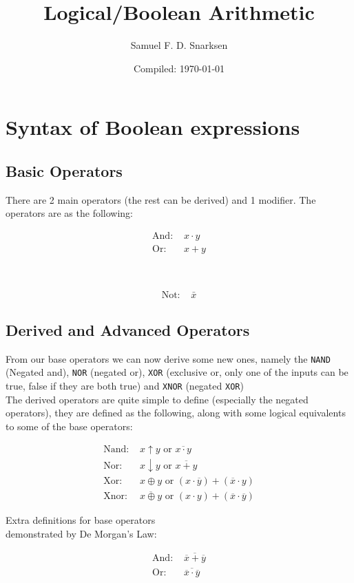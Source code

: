 \documentclass{article}
\newcommand{\code}[1]{\texttt{#1}}
\begin{document}
\title{Logical/Boolean Arithmetic}
\author{Samuel F. D. Snarksen}
\date{Compiled: \today}
\maketitle

\tableofcontents
\clearpage

\section[Syntax]{Syntax of Boolean expressions}
\subsection{Basic Operators}
There are 2 main operators (the rest can be derived) and 1 modifier. The operators are as the following:

\begin{align}
    \text{And: } & x \cdot y \\
    \text{Or: }  & x + y
\end{align}
\begin{center}
     \\
\end{center}
\begin{align}
    \text{Not: } & \bar{x}
\end{align}

\subsection[Derived Operators]{Derived and Advanced Operators}
From our base operators we can now derive some new ones, namely the \code{NAND} (Negated and), \code{NOR} (negated or), \code{XOR} (exclusive or, only one of the inputs can be true, false if they are both true) and \code{XNOR} (negated \code{XOR})\\

The derived operators are quite simple to define (especially the negated operators), they are defined as the following, along with some logical equivalents to some of the base operators: 

\begin{align}
    \text{Nand: } & x \uparrow y \text{ or } \overline{x \cdot y} \\
    \text{Nor: }  & x \downarrow y \text{ or } \overline{x + y}\\
    \text{Xor: }  & x \oplus y \text{ or } (x \cdot \overline{y}) + (\overline{x} \cdot y)\\
    \text{Xnor: } & \overline{x \oplus y} \text{ or } (x \cdot y) + (\overline{x} \cdot \overline{y})
\end{align}
\begin{center}
    Extra definitions for base operators\\
    demonstrated by De Morgan's Law:
\end{center}
\begin{align}
    \text{And: } & \overline{\overline{x} + \overline{y}}\\
    \text{Or: }  & \overline{\overline{x} \cdot \overline{y}}
\end{align}
\end{document}
